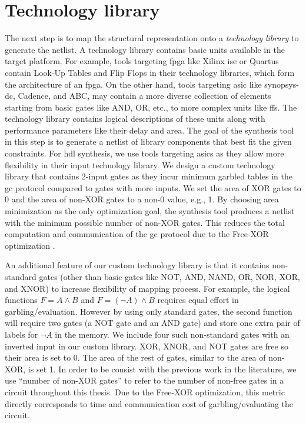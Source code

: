 \section{Technology library}\label{sec:syn-techlib}
The next step is to map the structural representation onto a \emph{technology library} to generate the netlist.
A technology library contains basic units available in the target platform.
For example, tools targeting \acrfull{fpga} like Xilinx \acrshort{ise} or Quartus contain Look-Up Tables and Flip Flops in their technology libraries, which form the architecture of an \acrshort{fpga}.
On the other hand, tools targeting \acrfull{asic} like \gls{synopsys-dc}, Cadence, and ABC, may contain a more diverse collection of elements starting from basic gates like AND, OR, etc., to more complex units like \acrshort{ff}s.
The technology library contains logical descriptions of these units along with performance parameters like their delay and area.
The goal of the synthesis tool in this step is to generate a netlist of library components that best fit the given constraints.
For \acrshort{hdl} synthesis, we use tools targeting \acrshort{asic}s as they allow more flexibility in their input technology library.
We design a custom technology library that contains 2-input gates as they incur minimum garbled tables in the \acrshort{gc} protocol compared to gates with more inputs.
We set the area of XOR gates to 0 and the area of non-XOR gates to a non-0 value, e.g., 1.
By choosing area minimization as the only optimization goal, the synthesis tool produces a netlist with the minimum possible number of non-XOR gates.
This reduces the total computation and communication of the \acrshort{gc} protocol due to the Free-XOR optimization \cite{kolesnikov2008improved}.

An additional feature of our custom technology library is that it contains non-standard gates (other than basic gates like NOT, AND, NAND, OR, NOR, XOR, and XNOR) to increase flexibility of mapping process.
For example, the logical functions $F = A\wedge B$ and $F = (\neg A)\wedge B$ requires equal effort in garbling/evaluation.
However by using only standard gates, the second function will require two gates (a NOT gate and an AND gate) and store one extra pair of labels for $\neg A$ in the memory.
We include four such non-standard gates with an inverted input in our custom library.
XOR, XNOR, and NOT gates are free so their area is set to 0.
The area of the rest of gates, similar to the area of non-XOR, is set 1.
In order to be consist with the previous work in the literature, we use ``number of non-XOR gates'' to refer to the number of non-free gates in a circuit throughout this thesis.
Due to the Free-XOR optimization, this metric directly corresponds to time and communication cost of garbling/evaluating the circuit.


